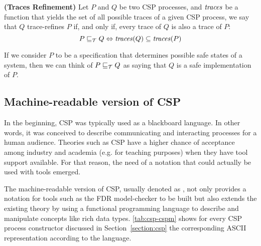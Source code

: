 \begin{definition}{\textbf{(Traces Refinement)}}
	Let $ P $ and $ Q $ be two CSP processes, and $ \mathit{\traces} $ be a function that yields the set of all possible traces of a given CSP process, we say that $ Q $ trace-refines $ P $ if, and only if, every trace of $ Q $ is also a trace of $ P $:
	\[  P \refinedby[\tmodel] Q \iff \mathit{\traces}(Q) \subseteq \mathit{\traces}(P) \]
\end{definition}

If we consider $ P $ to be a specification that determines possible safe states of a system, then we can think of $ P \refinedby[\tmodel] Q $ as saying that $ Q $ is a safe implementation of $P$.

\subsection{Machine-readable version of CSP}

In the beginning, CSP was typically used as a blackboard language. In other words, it was conceived to describe communicating and interacting processes for a human audience. Theories such as CSP have a higher chance of acceptance among industry and academia (e.g. for teaching purposes) when they have tool support available. For that reason, the need of a notation that could actually be used with tools emerged.

The machine-readable version of CSP, usually denoted as \CSPM{}, not only provides a notation for tools such as the FDR model-checker to be built but also extends the existing theory by using a functional programming language to describe and manipulate concepts like rich data types. \autoref{tab:csp-cspm} shows for every CSP process constructor discussed in Section~\ref{section:csp} the corresponding ASCII representation according to the \CSPM{} language.

